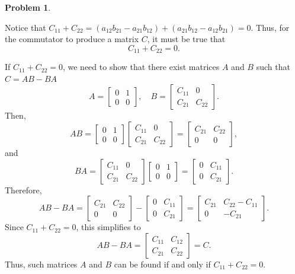 \documentclass[12pt]{article}
\theoremstyle{definition}
\newtheorem{problem}{Problem}
\begin{document}
\begin{problem}
\begin{solution}
    Notice that \( C_{11} + C_{22} = (a_{12}b_{21} - a_{21}b_{12}) + (a_{21}b_{12} - a_{12}b_{21}) = 0 \). Thus, for the commutator to produce a matrix \(C\), it must be true that
    \[    C_{11} + C_{22} = 0.    \]
    
    If \(C_{11} + C_{22} = 0\), we need to show that there exist matrices \(A\) and \(B\) such that \(C = AB - BA\)
    \[    A = \begin{bmatrix} 0 & 1 \\ 0 & 0 \end{bmatrix}, \quad B = \begin{bmatrix} C_{11} & 0 \\ C_{21} & C_{22} \end{bmatrix}.    \]
    Then,
    \[    AB = \begin{bmatrix} 0 & 1 \\ 0 & 0 \end{bmatrix} \begin{bmatrix} C_{11} & 0 \\ C_{21} & C_{22} \end{bmatrix}    = \begin{bmatrix} C_{21} & C_{22} \\ 0 & 0 \end{bmatrix},    \]
    and
    \[    BA = \begin{bmatrix} C_{11} & 0 \\ C_{21} & C_{22} \end{bmatrix} \begin{bmatrix} 0 & 1 \\ 0 & 0 \end{bmatrix}    = \begin{bmatrix} 0 & C_{11} \\ 0 & C_{21} \end{bmatrix}.    \]
    Therefore,
    \[    AB - BA = \begin{bmatrix} C_{21} & C_{22} \\ 0 & 0 \end{bmatrix} - \begin{bmatrix} 0 & C_{11} \\ 0 & C_{21} \end{bmatrix}    = \begin{bmatrix} C_{21} & C_{22} - C_{11} \\ 0 & -C_{21} \end{bmatrix}.    \]
    Since \(C_{11} + C_{22} = 0\), this simplifies to
    \[    AB - BA = \begin{bmatrix} C_{11} & C_{12} \\ C_{21} & C_{22} \end{bmatrix} = C.    \]
    Thus, such matrices \(A\) and \(B\) can be found if and only if \(C_{11} + C_{22} = 0\).



        
    \end{solution}
\end{problem}
\end{document}
